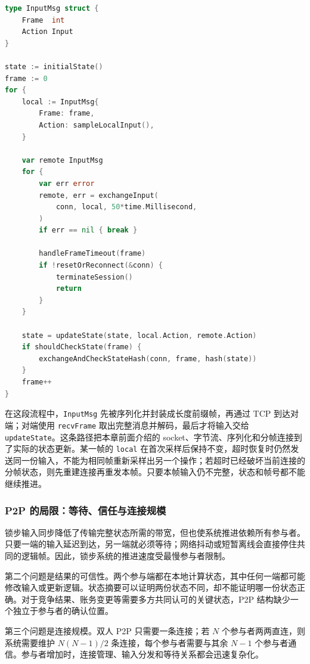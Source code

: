 \begin{tcolorbox}[title=锁步输入同步（概念示例）]
\begin{lstlisting}[style=codeblock, language=go]
type InputMsg struct {
    Frame  int
    Action Input
}

state := initialState()
frame := 0
for {
    local := InputMsg{
        Frame: frame,
        Action: sampleLocalInput(),
    }

    var remote InputMsg
    for {
        var err error
        remote, err = exchangeInput(
            conn, local, 50*time.Millisecond,
        )
        if err == nil { break }

        handleFrameTimeout(frame)
        if !resetOrReconnect(&conn) {
            terminateSession()
            return
        }
    }

    state = updateState(state, local.Action, remote.Action)
    if shouldCheckState(frame) {
        exchangeAndCheckStateHash(conn, frame, hash(state))
    }
    frame++
}
\end{lstlisting}
\end{tcolorbox}

在这段流程中，\texttt{InputMsg} 先被序列化并封装成长度前缀帧，再通过 TCP 到达对端；对端使用 \texttt{recvFrame} 取出完整消息并解码，最后才将输入交给 \texttt{updateState}。这条路径把本章前面介绍的 socket、字节流、序列化和分帧连接到了实际的状态更新。某一帧的 \texttt{local} 在首次采样后保持不变，超时恢复时仍然发送同一份输入，不能为相同帧重新采样出另一个操作；若超时已经破坏当前连接的分帧状态，则先重建连接再重发本帧。只要本帧输入仍不完整，状态和帧号都不能继续推进。

\subsubsection{P2P 的局限：等待、信任与连接规模}\label{sec2:p2p-limits}

锁步输入同步降低了传输完整状态所需的带宽，但也使系统推进依赖所有参与者。只要一端的输入延迟到达，另一端就必须等待；网络抖动或短暂离线会直接停住共同的逻辑帧。因此，锁步系统的推进速度受最慢参与者限制。

第二个问题是结果的可信性。两个参与端都在本地计算状态，其中任何一端都可能修改输入或更新逻辑。状态摘要可以证明两份状态不同，却不能证明哪一份状态正确。对于竞争结果、账务变更等需要多方共同认可的关键状态，P2P 结构缺少一个独立于参与者的确认位置。

第三个问题是连接规模。双人 P2P 只需要一条连接；若 $N$ 个参与者两两直连，则系统需要维护 $N(N-1)/2$ 条连接，每个参与者需要与其余 $N-1$ 个参与者通信。参与者增加时，连接管理、输入分发和等待关系都会迅速复杂化。

